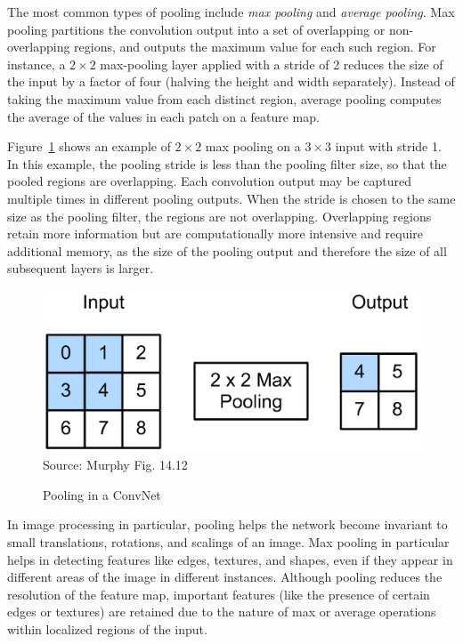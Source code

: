 The most common types of pooling include \emph{max pooling} and \emph{average pooling}. Max pooling partitions the convolution output into a set of overlapping or non-overlapping regions, and outputs the maximum value for each such region. For instance, a $2 \times 2$ max-pooling layer applied with a stride of 2 reduces the size of the input by a factor of four (halving the height and width separately). Instead of taking the maximum value from each distinct region, average pooling computes the average of the values in each patch on a feature map. 

Figure~\ref{fig:screen5_chap16} shows an example of $2 \times 2$ max pooling on a $3 \times 3$ input with stride 1. In this example, the pooling stride is less than the pooling filter size, so that the pooled regions are overlapping. Each convolution output may be captured multiple times in different pooling outputs. When the stride is chosen to the same size as the pooling filter, the regions are not overlapping. Overlapping regions retain more information but are computationally more intensive and require additional memory, as the size of the pooling output and therefore the size of all subsequent layers is larger. 

\begin{figure}
\centering
\includegraphics[width=.5\textwidth]{screen5.png} \\

\scriptsize Source: Murphy Fig. 14.12
\caption{Pooling in a ConvNet}
\label{fig:screen5_chap16}
\end{figure}

In image processing in particular, pooling helps the network become invariant to small translations, rotations, and scalings of an image. Max pooling in particular helps in detecting features like edges, textures, and shapes, even if they appear in different areas of the image in different instances. Although pooling reduces the resolution of the feature map, important features (like the presence of certain edges or textures) are retained due to the nature of max or average operations within localized regions of the input.

